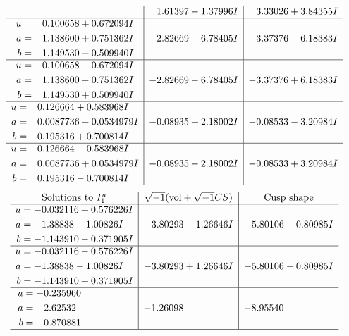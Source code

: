 \documentclass[1p]{elsarticle_modified}
\theoremstyle{definition}
\newcommand{\I}{\sqrt{-1}}
\begin{document}
$$\begin{array}{c|c|c}
 & \phantom{-}1.61397 - 1.37996 I & \phantom{-}3.33026 + 3.84355 I \\ \hline\begin{aligned}
u &= \phantom{-}0.100658 + 0.672094 I \\
a &= \phantom{-}1.138600 + 0.751362 I \\
b &= \phantom{-}1.149530 - 0.509940 I\end{aligned}
 & -2.82669 + 6.78405 I & -3.37376 - 6.18383 I \\ \hline\begin{aligned}
u &= \phantom{-}0.100658 - 0.672094 I \\
a &= \phantom{-}1.138600 - 0.751362 I \\
b &= \phantom{-}1.149530 + 0.509940 I\end{aligned}
 & -2.82669 - 6.78405 I & -3.37376 + 6.18383 I \\ \hline\begin{aligned}
u &= \phantom{-}0.126664 + 0.583968 I \\
a &= \phantom{-}0.0087736 - 0.0534979 I \\
b &= \phantom{-}0.195316 + 0.700814 I\end{aligned}
 & -0.08935 + 2.18002 I & -0.08533 - 3.20984 I \\ \hline\begin{aligned}
u &= \phantom{-}0.126664 - 0.583968 I \\
a &= \phantom{-}0.0087736 + 0.0534979 I \\
b &= \phantom{-}0.195316 - 0.700814 I\end{aligned}
 & -0.08935 - 2.18002 I & -0.08533 + 3.20984 I\\
 \hline 
 \end{array}$$\newpage$$\begin{array}{c|c|c}  
\text{Solutions to }I^u_{1}& \I (\text{vol} + \sqrt{-1}CS) & \text{Cusp shape}\\
 \hline 
\begin{aligned}
u &= -0.032116 + 0.576226 I \\
a &= -1.38838 + 1.00826 I \\
b &= -1.143910 - 0.371905 I\end{aligned}
 & -3.80293 - 1.26646 I & -5.80106 + 0.80985 I \\ \hline\begin{aligned}
u &= -0.032116 - 0.576226 I \\
a &= -1.38838 - 1.00826 I \\
b &= -1.143910 + 0.371905 I\end{aligned}
 & -3.80293 + 1.26646 I & -5.80106 - 0.80985 I \\ \hline\begin{aligned}
u &= -0.235960\phantom{ +0.000000I} \\
a &= \phantom{-}2.62532\phantom{ +0.000000I} \\
b &= -0.870881\phantom{ +0.000000I}\end{aligned}
 & -1.26098\phantom{ +0.000000I} & -8.95540\phantom{ +0.000000I}\\
 \hline 
 \end{array}$$\newpage\newpage\renewcommand{\arraystretch}{1}
\end{document}
